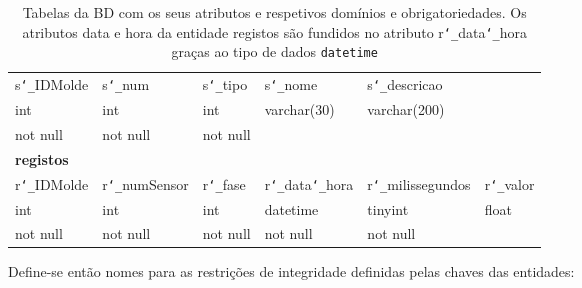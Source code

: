 \documentclass[11pt,twoside,a4paper]{report}
\begin{document}
\begin{table}[H]
\begin{tabular}{|l|l|l|l|l|l|}
		s\texttt{\char`_}IDMolde & s\texttt{\char`_}num & s\texttt{\char`_}tipo & s\texttt{\char`_}nome & s\texttt{\char`_}descricao & \multicolumn{1}{l}{}\\ \cline{1-5}
		int & int & int & varchar(30) & varchar(200) & \multicolumn{1}{l}{}\\ \cline{1-5}
		not null & not null & not null & & & \multicolumn{1}{l}{}\\ \cline{1-5}
		\multicolumn{6}{l}{\textbf{registos}}\\ \hline
		r\texttt{\char`_}IDMolde & r\texttt{\char`_}numSensor & r\texttt{\char`_}fase &  r\texttt{\char`_}data\texttt{\char`_}hora & r\texttt{\char`_}milissegundos & r\texttt{\char`_}valor\\ \hline
		int & int & int & datetime & tinyint & float\\ \hline
		not null & not null & not null & not null & not null & \\ \hline
	\end{tabular}
	\caption[Tabelas da base de dados]{Tabelas da BD com os seus atributos e respetivos domínios e obrigatoriedades. Os atributos data e hora da entidade registos são fundidos no atributo r\texttt{\char`_}data\texttt{\char`_}hora graças ao tipo de dados \texttt{datetime}}
	\label{tab:dominio}
\end{table}
Define-se então nomes para as restrições de integridade definidas pelas chaves das entidades:
\end{document}
